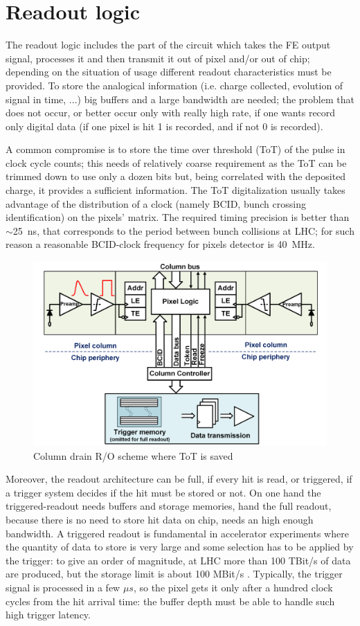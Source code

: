 \section{Readout logic}
   The readout logic includes the part of the circuit which takes the FE output signal, processes it and then transmit it out of pixel and/or out of chip; depending on the situation of usage different readout characteristics must be provided. 
   To store the analogical information (i.e. charge collected, evolution of signal in time, ...) big buffers and a large bandwidth are needed; the problem that does not occur, or better occur only with really high rate, if one wants record only digital data (if one pixel is hit 1 is recorded, and if not 0 is recorded). 

   A common compromise is to store the time over threshold (ToT) of the pulse in clock cycle counts; this needs of relatively coarse requirement as the ToT can be trimmed down to use only a dozen bits but, being correlated with the deposited charge, it provides a sufficient information.
   The ToT digitalization usually takes advantage of the distribution of a clock (namely BCID,  bunch crossing identification) on the pixels' matrix. The required timing precision is better than $\sim$\SI{25}{ns}, that corresponds to the period between bunch collisions at LHC; for such reason a reasonable BCID-clock frequency for pixels detector is \SI{40}{MHz}.
   \begin{figure}[h!]
      \centering
      \includegraphics[width=.7\linewidth]{figures/Pixel_detectors/column_drain_RO.png}
      \caption{Column drain R/O scheme where ToT is saved}
      \label{fig:column_drain_RO-like}
   \end{figure}

   Moreover, the readout architecture can be full, if every hit is read, or triggered, if a trigger system decides if the hit must be stored or not. On one hand the triggered-readout needs buffers and storage memories,  hand the full readout, because there is no need to store hit data on chip, needs an high enough bandwidth.
   A triggered readout is fundamental in accelerator experiments where the quantity of data to store is very large and some selection has to be applied by the trigger: to give an order of magnitude, at LHC more than 100 TBit/s of data are produced, but the storage limit is about 100 MBit/s \cite{K-Wermes}.
   Typically, the trigger signal is processed in a few $\mu s$, so the pixel gets it only after a hundred clock cycles from the hit arrival time: the buffer depth must be able to handle such high trigger latency. 
 
